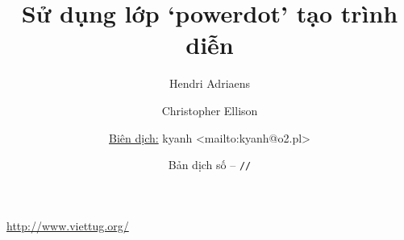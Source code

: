 \vfill


\title{%
 \vspace*{4cm}
 {\ftitle Sử dụng lớp `powerdot' tạo trình diễn}
}
\author{%
	\vspace*{2mm}
	\fmysign Hendri Adriaens
	\and \fmysign Christopher Ellison
	\\[4mm]
	\and \fmysign\underline{Biên dịch:} kyanh <{mailto:kyanh@o2.pl}>
	\\[2mm]}
\date{%
	\Large
	{Bản dịch số} \texttt{\the\buildnum} -- \texttt{\the\year/\the\month/\the\day}
	\\[2mm]
	}
\maketitle

\thispagestyle{empty}

\vfill
\centerline{\LARGE\url{http://www.viettug.org/}}

\endinput
